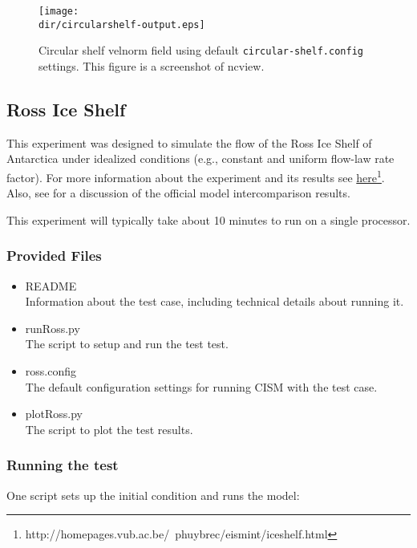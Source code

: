 \begin{figure}[H!]
	\centering
	\texttt{[image: \\dir/circularshelf-output.eps]}
	\caption{Circular shelf velnorm field using default \texttt{circular-shelf.config} settings. This figure is a screenshot of ncview.}
	\label{fig:circularshelf-results}
\end{figure}
\FloatBarrier

\subsection{Ross Ice Shelf}
This experiment was designed to simulate the flow of the Ross Ice Shelf of Antarctica under idealized conditions (e.g., constant and uniform
flow-law rate factor). For more information about the experiment and its results see 
\href{http://homepages.vub.ac.be/~phuybrec/eismint/iceshelf.html}{here}\footnote{http://homepages.vub.ac.be/~phuybrec/eismint/iceshelf.html}. 
Also, see \citet{MacAyeal:1996vn} for a discussion of the official model intercomparison results.

This experiment will typically take about 10 minutes to run on a single processor.

\subsubsection{Provided Files}

\begin{itemize}
	\item README \\
		Information about the test case, including technical details about running it.
	\item runRoss.py \\
		The script to setup and run the test test.
	\item ross.config \\
  The default configuration settings for running CISM with the test case.
	\item plotRoss.py \\
		The script to plot the test results.
\end{itemize}

\subsubsection{Running the test}
One script sets up the initial condition and runs the model:

